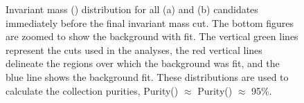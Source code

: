 \documentclass[../AnalysisNoteJBuxton.tex]{subfiles}
\begin{document}
\begin{figure}[h!]
  \centering
  \caption[\Lam and \ALam Purity]{Invariant mass (\minv) distribution for all \Lam (a) and \ALam (b) candidates immediately before the final invariant mass cut.  The bottom figures are zoomed to show the background with fit.  The vertical green lines represent the \minv cuts used in the analyses, the red vertical lines delineate the regions over which the background was fit, and the blue line shows the background fit.  These distributions are used to calculate the collection purities, Purity(\Lam) $\approx$ Purity(\ALam) $\approx$ 95\%.}
  \label{fig:cLamPurity}
\end{figure}
\end{document}
